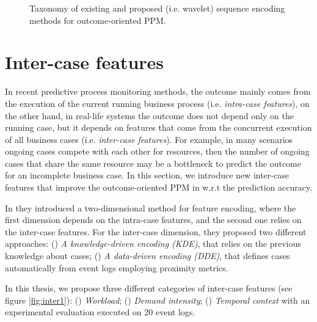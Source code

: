 \begin{figure}[htb]
	\begin{center}
		\caption[Wavelet encoding method taxonomy]{Taxonomy of existing and proposed (i.e. wavelet) sequence encoding methods for outcome-oriented PPM.}
		\label{fig:dwt5}
	\end{center}
\end{figure}

\section{Inter-case features} \label{inter}
In recent predictive process monitoring methods, the outcome mainly comes from the execution of the current running business process (i.e. \textit{intra-case features}), on the other hand, in real-life systems the outcome does not depend only on the running case, but it depends on features that come from the concurrent execution of all business cases (i.e. \textit{inter-case features}). For example, in many scenarios ongoing cases compete with each other for resources, then the number of ongoing cases that share the same resource  may be a bottleneck to predict the outcome for an incomplete business case. In this section, we introduce new inter-case features that improve the outcome-oriented PPM in w.r.t the prediction accuracy.

In \cite{senderovich2019knowledge} they introduced a two-dimensional method for feature encoding, where the first dimension depends on the intra-case features, and the second one relies on the inter-case features. For the inter-case dimension, they proposed two different approaches: () \textit{A knowledge-driven encoding (KDE)}, that relies on the previous knowledge about cases; () \textit{A data-driven encoding (DDE)}, that defines cases automatically from event logs employing proximity metrics. 

In this thesis, we propose three different categories of inter-case features (see figure \ref{fig:inter1}): () \textit{Workload}; () \textit{Demand intensity}; () \textit{Temporal context} with an experimental evaluation executed on 20 event logs.

